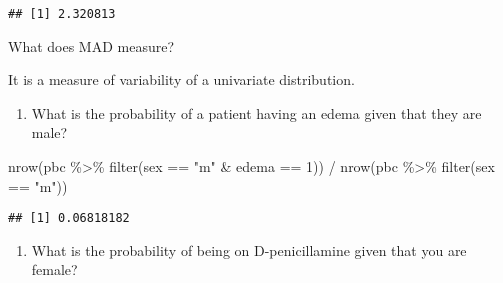 \documentclass[
]{article}
\newenvironment{Shaded}{\begin{snugshade}}{\end{snugshade}}
\newcommand{\ControlFlowTok}[1]{\textcolor[rgb]{0.13,0.29,0.53}{\textbf{#1}}}
\newcommand{\DecValTok}[1]{\textcolor[rgb]{0.00,0.00,0.81}{#1}}
\newcommand{\FunctionTok}[1]{\textcolor[rgb]{0.00,0.00,0.00}{#1}}
\newcommand{\NormalTok}[1]{#1}
\newcommand{\OtherTok}[1]{\textcolor[rgb]{0.56,0.35,0.01}{#1}}
\newcommand{\SpecialCharTok}[1]{\textcolor[rgb]{0.00,0.00,0.00}{#1}}
\newcommand{\StringTok}[1]{\textcolor[rgb]{0.31,0.60,0.02}{#1}}
\providecommand{\tightlist}{%
  \setlength{\itemsep}{0pt}\setlength{\parskip}{0pt}}
\begin{document}
\begin{Shaded}
\end{Shaded}

\begin{verbatim}
## [1] 2.320813
\end{verbatim}

What does MAD measure?

It is a measure of variability of a univariate distribution.

\begin{enumerate}
\def\labelenumi{\alph{enumi})}
\setcounter{enumi}{2}
\tightlist
\item
  What is the probability of a patient having an edema given that they
  are male?
\end{enumerate}

\begin{Shaded}
\begin{Highlighting}[]
\FunctionTok{nrow}\NormalTok{(pbc }\SpecialCharTok{\%\textgreater{}\%}
       \FunctionTok{filter}\NormalTok{(sex }\SpecialCharTok{==} \StringTok{"m"} \SpecialCharTok{\&}\NormalTok{ edema }\SpecialCharTok{==} \DecValTok{1}\NormalTok{)) }\SpecialCharTok{/} 
  \FunctionTok{nrow}\NormalTok{(pbc }\SpecialCharTok{\%\textgreater{}\%}
         \FunctionTok{filter}\NormalTok{(sex }\SpecialCharTok{==} \StringTok{"m"}\NormalTok{))}
\end{Highlighting}
\end{Shaded}

\begin{verbatim}
## [1] 0.06818182
\end{verbatim}

\begin{enumerate}
\def\labelenumi{\alph{enumi})}
\setcounter{enumi}{3}
\tightlist
\item
  What is the probability of being on D-penicillamine given that you are
  female?
\end{enumerate}
\end{document}
